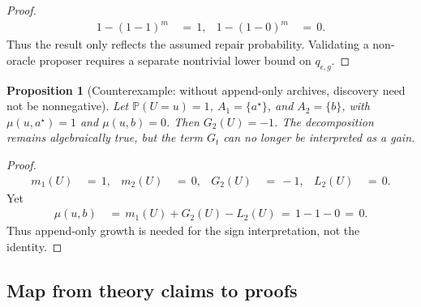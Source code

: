 \documentclass{article} %
\newtheorem{proposition}[theorem]{Proposition}
\begin{document}
\begin{proof}
\begin{equation}
\begin{aligned}
1-(1-1)^m
&\,=\,1, &
1-(1-0)^m
&\,=\,0.
\end{aligned}
\end{equation}
Thus the result only reflects the assumed repair probability.  Validating a
non-oracle proposer requires a separate nontrivial lower bound on
\(q_{\epsilon,g}\).
\end{proof}

\begin{proposition}[Counterexample: without append-only archives, discovery need not be nonnegative]
\label{prop:11}
Let \(\mathbb P(U=u)=1\), \(A_1=\{a^\star\}\), and \(A_2=\{b\}\), with
\(\mu(u,a^\star)=1\) and \(\mu(u,b)=0\).  Then \(G_2(U)=-1\).
The decomposition remains algebraically true, but the term \(G_t\) can no longer be interpreted as a gain.
\end{proposition}

\begin{proof}
\begin{equation}
\begin{aligned}
m_1(U)
&\,=\,1, &
m_2(U)
&\,=\,0, &
G_2(U)
&\,=\,-1, &
L_2(U)
&\,=\,0.
\end{aligned}
\end{equation}
Yet
\begin{equation}
\begin{aligned}
\mu(u,b)
&\,=\,m_1(U)+G_2(U)-L_2(U)
\,=\,1-1-0
\,=\,0.
\end{aligned}
\end{equation}
Thus append-only growth is needed for the sign interpretation, not the
identity.
\end{proof}

\subsection{Map from theory claims to proofs}
\end{document}
